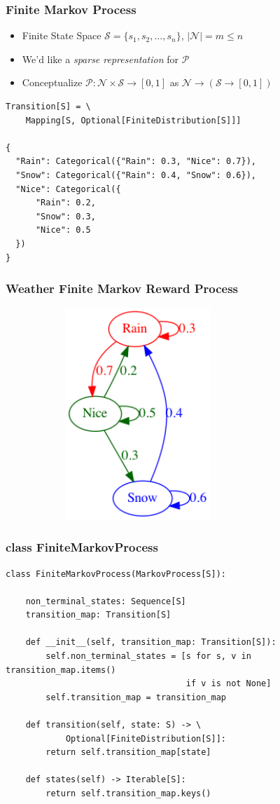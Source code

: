 \documentclass[handout]{beamer}
\begin{document}
\begin{frame}[fragile]
\frametitle{Finite Markov Process}
\pause
\begin{itemize}[<+->]
\item Finite State Space $\mathcal{S} = \{s_1, s_2, \ldots, s_n\}$, $|\mathcal{N}| = m\leq n$
\item We'd like a {\em sparse representation} for $\mathcal{P}$
\item Conceptualize $\mathcal{P} : \mathcal{N} \times \mathcal{S} \rightarrow [0, 1]$ as $\mathcal{N} \rightarrow (\mathcal{S} \rightarrow [0, 1])$
\end{itemize}
\begin{lstlisting}
Transition[S] = \
    Mapping[S, Optional[FiniteDistribution[S]]]

{
  "Rain": Categorical({"Rain": 0.3, "Nice": 0.7}),
  "Snow": Categorical({"Rain": 0.4, "Snow": 0.6}),
  "Nice": Categorical({
      "Rain": 0.2,
      "Snow": 0.3,
      "Nice": 0.5
  })
}
\end{lstlisting}
\end{frame}

\begin{frame}
\frametitle{Weather Finite Markov Reward Process}
\includegraphics[width=10cm, height=8cm]{weather_mp.png}
\end{frame}

\begin{frame}[fragile]
\frametitle{class FiniteMarkovProcess}
\pause
\begin{lstlisting}
class FiniteMarkovProcess(MarkovProcess[S]):
    
    non_terminal_states: Sequence[S]
    transition_map: Transition[S]

    def __init__(self, transition_map: Transition[S]):
        self.non_terminal_states = [s for s, v in transition_map.items()
                                    if v is not None]
        self.transition_map = transition_map

    def transition(self, state: S) -> \
            Optional[FiniteDistribution[S]]:
        return self.transition_map[state]

    def states(self) -> Iterable[S]:
        return self.transition_map.keys()
\end{lstlisting}
\end{frame}
\end{document}
